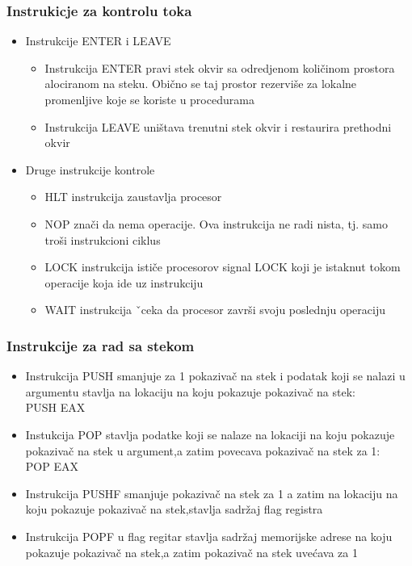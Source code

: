 \documentclass[hyperref={pdfpagelabels=false}]{beamer}
\begin{document}
	\begin{frame}
		\frametitle{Instrukicje za kontrolu toka}
		\begin{itemize}
			\item Instrukcije ENTER i LEAVE\pause
				\begin{itemize}
					\item Instrukcija ENTER pravi stek okvir sa odredjenom koli\v cinom prostora alociranom na steku. Obi\v cno se taj prostor rezervi\v se za 
					lokalne promenljive koje se koriste u procedurama \pause
					\item Instrukcija LEAVE uni\v stava trenutni stek okvir i restaurira prethodni okvir \pause
				\end{itemize}
				
			\item Druge instrukcije kontrole\pause
				\begin{itemize}
					\item HLT instrukcija zaustavlja procesor \pause
					\item NOP zna\v ci da nema operacije. Ova instrukcija ne radi nista, tj. samo tro\v si instrukcioni ciklus \pause
					\item LOCK instrukcija isti\v ce procesorov signal LOCK koji je istaknut tokom operacije koja ide uz instrukciju\pause
					\item WAIT instrukcija ˇceka da procesor zavr\v si svoju poslednju operaciju
				\end{itemize}
		\end{itemize}
	\end{frame}
	
	\begin{frame}
		\frametitle{Instrukcije za rad sa stekom}
		\begin{itemize}
			\item \pause Instrukcija PUSH smanjuje za 1 pokaziva\v c na stek i podatak koji se nalazi u argumentu stavlja na lokaciju na koju pokazuje 
			pokaziva\v c na stek:\\ \pause
			PUSH EAX \pause
			\item Instukcija POP stavlja podatke koji se nalaze na lokaciji na koju pokazuje pokaziva\v c na stek u argument,a zatim povecava pokaziva\v c
			na stek za 1:\pause \\
			POP EAX
			\item Instrukcija PUSHF smanjuje pokaziva\v c na stek za 1 a zatim na lokaciju na koju pokazuje pokaziva\v c na stek,stavlja sadr\v zaj flag 
			registra\pause
			\item Instrukcija POPF u flag regitar stavlja sadr\v zaj memorijske adrese na koju pokazuje pokaziva\v c na stek,a zatim pokaziva\v c na stek 
			uve\' cava za 1\pause
		\end{itemize}
	\end{frame}
	
\end{document}
